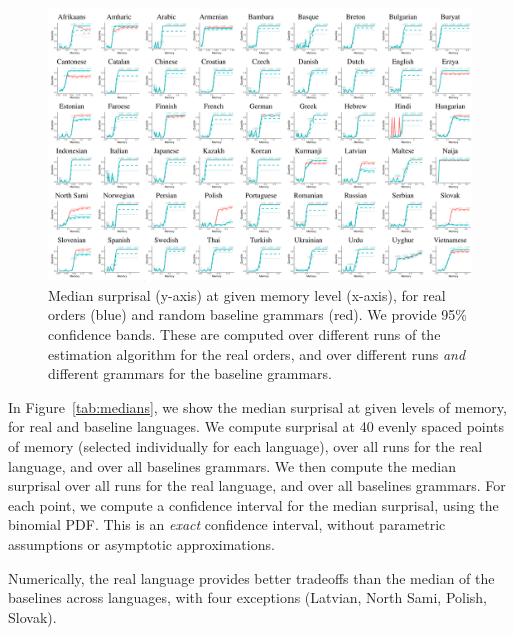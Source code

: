 \begin{figure}
	\begin{center}
\includegraphics[width=\textwidth]{quantiles-table.pdf}
\end{center}
	\caption{Median surprisal (y-axis) at given memory level (x-axis), for real orders (blue) and random baseline grammars (red). We provide 95\% confidence bands. These are computed over different runs of the estimation algorithm for the real orders, and over different runs \emph{and} different grammars for the baseline grammars.}\label{fig:median-table}
\end{figure}






In Figure~\ref{tab:medians}, we show the median surprisal at given levels of memory, for real and baseline languages.
We compute surprisal at 40 evenly spaced points of memory (selected individually for each language), over all runs for the real language, and over all baselines grammars.
We then compute the median surprisal over all runs for the real language, and over all baselines grammars.
For each point, we compute a confidence interval for the median surprisal, using the binomial PDF. 
This is an \emph{exact} confidence interval, without parametric assumptions or asymptotic approximations.

Numerically, the real language provides better tradeoffs than the median of the baselines across languages, with four exceptions (Latvian, North Sami, Polish, Slovak).

